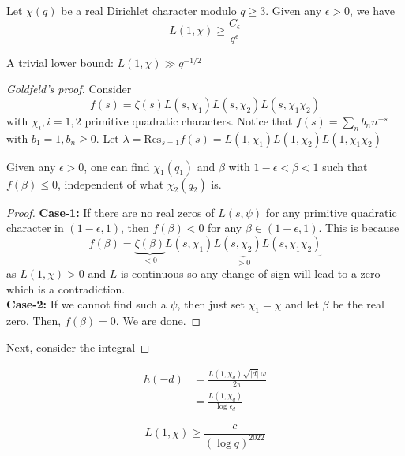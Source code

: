 \documentclass[oneside, 12pt, ]{scrbook}
\theoremstyle{theorem}
\begin{document}
\begin{theorem}[Siegel]
Let $\chi(q)$ be a real Dirichlet character modulo $q\geq 3$. Given any $\epsilon >0$, we have $$L(1, \chi) \geq \frac{C_{\epsilon}}{q^{\epsilon}}$$
\end{theorem}

A trivial lower bound: $L(1, \chi) \gg q^{-1/2}$

\begin{proof}[Goldfeld's proof]
Consider $$f(s) = \zeta(s)L(s,\chi_{1})L(s,\chi_{2})L(s,\chi_{1}\chi_{2})$$ with $\chi_{i}, i=1,2$ primitive quadratic characters. Notice that $f(s) = \sum_{n} b_{n}n^{-s}$ with $b_{1} =1 , b_{n} \geq 0$. Let $\lambda = \mathrm{Res}_{s=1}f(s) = L(1,\chi_{1})L(1,\chi_{2})L(1,\chi_{1}\chi_{2})$

\begin{lemma}
Given any $\epsilon >0$, one can find $\chi_{1}(q_{1})$ and $\beta$ with $1-\epsilon < \beta < 1$ such that $f(\beta) \le 0$, independent of what $\chi_{2}(q_{2})$ is. 
\end{lemma}

\begin{proof}
\textbf{Case-1:} If there are no real zeros of $L(s, \psi)$ for any primitive quadratic character in $(1-\epsilon,1)$, then $f(\beta) < 0$ for any $\beta \in (1 - \epsilon,1)$. This is because $$f(\beta) = \underbrace{\zeta(\beta)}_{<0} \underbrace{L(s,\chi_{1})L(s,\chi_{2})L(s,\chi_{1}\chi_{2})}_{>0}$$ as $L(1,\chi)>0$ and $L$ is continuous so any change of sign will lead to a zero which is a contradiction. \\
\textbf{Case-2:} If we cannot find such a $\psi$, then just set $\chi_{1}=\chi$ and let $\beta$ be the real zero. Then, $f(\beta)=0$. We are done. 
\end{proof}

Next, consider the integral 

\end{proof}

\begin{corollary}
\begin{align*}
h(-d) &= \frac{L(1,\chi_{d}) \sqrt{|d|} \;\omega}{2 \pi} \\
&= \frac{L(1,\chi_{d})}{\log \epsilon_{d}}
\end{align*}
\end{corollary}

\begin{theorem}[Y. Zhang]
$$L(1, \chi) \geq \frac{c}{(\log q)^{2022}}$$
\end{theorem}
\end{document}
